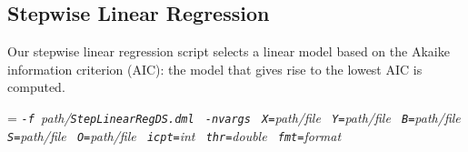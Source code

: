 \begin{comment}

 Licensed to the Apache Software Foundation (ASF) under one
 or more contributor license agreements.  See the NOTICE file
 distributed with this work for additional information
 regarding copyright ownership.  The ASF licenses this file
 to you under the Apache License, Version 2.0 (the
 "License"); you may not use this file except in compliance
 with the License.  You may obtain a copy of the License at

   http://www.apache.org/licenses/LICENSE-2.0

 Unless required by applicable law or agreed to in writing,
 software distributed under the License is distributed on an
 "AS IS" BASIS, WITHOUT WARRANTIES OR CONDITIONS OF ANY
 KIND, either express or implied.  See the License for the
 specific language governing permissions and limitations
 under the License.

\end{comment}

\subsection{Stepwise Linear Regression}

\smallskip

Our stepwise linear regression script selects a linear model based on the Akaike information criterion (AIC): 
the model that gives rise to the lowest AIC is computed. \\

\smallskip
{}
\smallskip

{\hangindent=\parindent\noindent\it%
{\tt{}-f }path/\/{\tt{}StepLinearRegDS.dml}
{\tt{} -nvargs}
{\tt{} X=}path/file
{\tt{} Y=}path/file
{\tt{} B=}path/file
{\tt{} S=}path/file
{\tt{} O=}path/file
{\tt{} icpt=}int
{\tt{} thr=}double
{\tt{} fmt=}format

}

